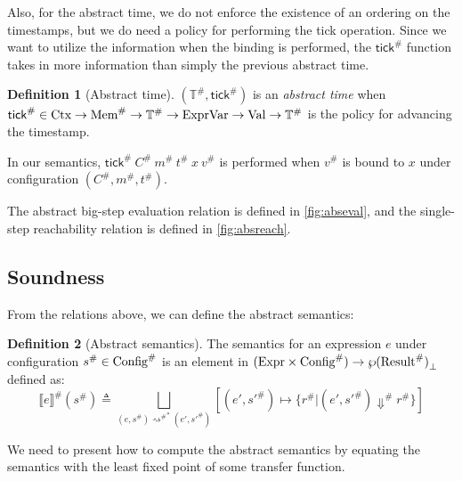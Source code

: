 \documentclass[acmsmall,screen,review]{acmart}
\theoremstyle{definition}
\newtheorem{definition}{Definition}[section]
\newcommand*{\A}[1]{{#1}^{\#}}
\newcommand*{\Expr}{\text{Expr}}
\newcommand*{\ExprVar}{\text{ExprVar}}
\newcommand*{\Time}{\mathbb{T}}
\newcommand*{\ATime}{\A{\Time}}
\newcommand*{\Ctx}[1]{\text{Ctx}\vphantom{#1}}
\newcommand*{\Value}[1]{\text{Val}\vphantom{#1}}
\newcommand*{\mem}{m}
\newcommand*{\AMem}[1]{\A{\text{Mem}}\vphantom{#1}}
\newcommand*{\AConfig}[1]{\A{\text{Config}}\vphantom{#1}}
\newcommand*{\AResult}[1]{\A{\text{Result}}\vphantom{#1}}
\newcommand*{\sembracket}[1]{\lBrack{#1}\rBrack}
\newcommand*{\tick}{\mathsf{tick}}
\begin{document}
Also, for the abstract time, we do not enforce the existence of an ordering on the timestamps, but we do need a policy for performing the tick operation.
Since we want to utilize the information when the binding is performed, the $\A{\tick}$ function takes in more information than simply the previous abstract time.
\begin{definition}[Abstract time]
  $(\ATime,\A{\tick})$ is an \emph{abstract time} when $\A{\tick}\in\Ctx{\ATime}\rightarrow\AMem{\ATime}\rightarrow\ATime\rightarrow\ExprVar\rightarrow\Value{\ATime}\rightarrow\ATime$ is the policy for advancing the timestamp.
\end{definition}
In our semantics, $\A{\tick}\:\A{C}\:\A{\mem}\:\A{t}\:x\:\A{v}$ is performed when $\A{v}$ is bound to $x$ under configuration $(\A{C},\A{\mem},\A{t})$.

The abstract big-step evaluation relation is defined in \ref{fig:abseval}, and the single-step reachability relation is defined in \ref{fig:absreach}.

\subsection{Soundness}

From the relations above, we can define the abstract semantics:
\begin{definition}[Abstract semantics]
  The semantics for an expression $e$ under configuration $\A{s}\in\AConfig{\ATime}$ is an element in $(\Expr\times\AConfig{\ATime})\rightarrow{\wp(\AResult{\ATime})}_{\bot}$ defined as:
  \[
    \A{\sembracket{e}}(\A{s})\triangleq\bigsqcup_{(e,\A{s}){\A\rightsquigarrow}^{*}(e',\A{s'})}[(e',\A{s'})\mapsto\{\A{r}|(e',\A{s'})\A\Downarrow \A{r}\}]
  \]
\end{definition}

We need to present how to compute the abstract semantics by equating the semantics with the least fixed point of some transfer function.
\end{document}
